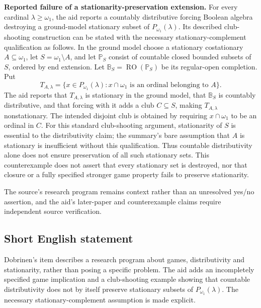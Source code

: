 \documentclass[11pt]{article}
\begin{document}
\textbf{Reported failure of a stationarity-preservation extension.} For every cardinal \(\lambda\geq\omega_1\), the aid reports a countably distributive forcing Boolean algebra destroying a ground-model stationary subset of \(P_{\omega_1}(\lambda)\). Its described club-shooting construction can be stated with the necessary stationary-complement qualification as follows. In the ground model choose a stationary costationary \(A\subseteq\omega_1\), let \(S=\omega_1\setminus A\), and let \(\mathbb P_S\) consist of countable closed bounded subsets of \(S\), ordered by end extension. Let \(\mathbb B_S=\operatorname{RO}(\mathbb P_S)\) be its regular-open completion. Put
\[
 T_{A,\lambda}=\{x\in P_{\omega_1}(\lambda):
 x\cap\omega_1\text{ is an ordinal belonging to }A\}.
\]
The aid reports that \(T_{A,\lambda}\) is stationary in the ground model, that \(\mathbb B_S\) is countably distributive, and that forcing with it adds a club \(C\subseteq S\), making \(T_{A,\lambda}\) nonstationary. The intended disjoint club is obtained by requiring \(x\cap\omega_1\) to be an ordinal in \(C\). For this standard club-shooting argument, stationarity of \(S\) is essential to the distributivity claim; the summary's bare assumption that \(A\) is stationary is insufficient without this qualification. Thus countable distributivity alone does not ensure preservation of all such stationary sets. This counterexample does not assert that every stationary set is destroyed, nor that closure or a fully specified stronger game property fails to preserve stationarity.

The source's research program remains context rather than an unresolved yes/no assertion, and the aid's later-paper and counterexample claims require independent source verification.
\subsection{Short English statement}
Dobrinen's item describes a research program about games, distributivity and stationarity, rather than posing a specific problem. The aid adds an incompletely specified game implication and a club-shooting example showing that countable distributivity does not by itself preserve stationary subsets of \(P_{\omega_1}(\lambda)\). The necessary stationary-complement assumption is made explicit.
\end{document}
